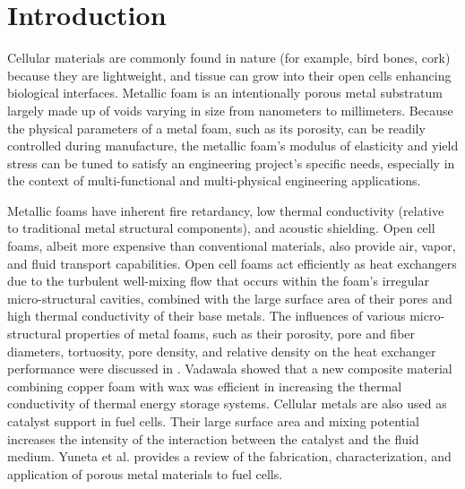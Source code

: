 \documentclass[review]{elsarticle}
\begin{document}
\linenumbers

\section{Introduction}

Cellular materials are commonly found in nature (for example, bird bones, cork) because they are lightweight, and tissue can grow into their open cells enhancing biological interfaces. Metallic foam is an intentionally porous metal substratum largely made up of voids varying in size from nanometers to millimeters. Because the physical parameters of a metal foam, such as its porosity, can be readily controlled during manufacture, the metallic foam's modulus of elasticity and yield stress can be tuned to satisfy an engineering project's specific needs, especially in the context of multi-functional and multi-physical engineering applications.

Metallic foams have inherent fire retardancy, low thermal conductivity (relative to traditional metal structural components), and acoustic shielding. Open cell foams, albeit more expensive than conventional materials, also provide air, vapor, and fluid transport capabilities. Open cell foams act efficiently as heat exchangers due to the turbulent well-mixing flow that occurs within the foam's irregular micro-structural cavities, combined with the large surface area of their pores and high thermal conductivity of their base metals. The influences of various micro-structural properties of metal foams, such as their porosity, pore and fiber diameters, tortuosity, pore density, and relative density on the heat exchanger performance were discussed in \cite{MahjoobKambiz2008}. Vadawala \cite{Vadwala2011} showed that a new composite material combining copper foam with wax was efficient in increasing the thermal conductivity of thermal energy storage systems. Cellular metals are also used as catalyst support in fuel cells. Their large surface area and mixing potential increases the intensity of the interaction between the catalyst and the fluid medium. Yuneta et al. \cite{Yuanetal2012} provides a review of the fabrication, characterization, and application of porous metal materials to fuel cells.
\end{document}

